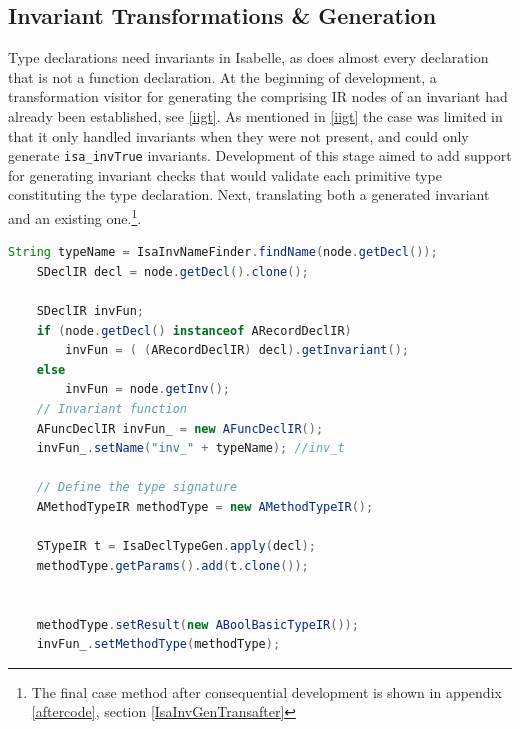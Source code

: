 	\subsection{Invariant Transformations \& Generation} \label{itag}
	Type declarations need invariants in Isabelle, as does almost every declaration that is not a function declaration. At the beginning of development, a transformation visitor for generating the comprising IR nodes of an invariant had already been established, see \ref{iigt}. As mentioned in \ref{iigt} the case was limited in that it only handled invariants when they were not present, and could only generate \lstinline[language=Java]{isa_invTrue} invariants. Development of this stage aimed to add support for generating invariant checks that would validate each primitive type constituting the type declaration. Next, translating both a generated invariant and an existing one.\footnote{The final case method after consequential development is shown in appendix \ref{aftercode}, section \ref{IsaInvGenTransafter}}. 

	\begin{lstlisting}[language=Java]
	String typeName = IsaInvNameFinder.findName(node.getDecl());
    SDeclIR decl = node.getDecl().clone();
     
    SDeclIR invFun;
    if (node.getDecl() instanceof ARecordDeclIR)
    	invFun = ( (ARecordDeclIR) decl).getInvariant();
    else
    	invFun = node.getInv();
    // Invariant function
    AFuncDeclIR invFun_ = new AFuncDeclIR();
    invFun_.setName("inv_" + typeName); //inv_t

    // Define the type signature
    AMethodTypeIR methodType = new AMethodTypeIR();
    
    STypeIR t = IsaDeclTypeGen.apply(decl);
    methodType.getParams().add(t.clone());
    
        
	methodType.setResult(new ABoolBasicTypeIR());
    invFun_.setMethodType(methodType);
	\end{lstlisting}  
	
